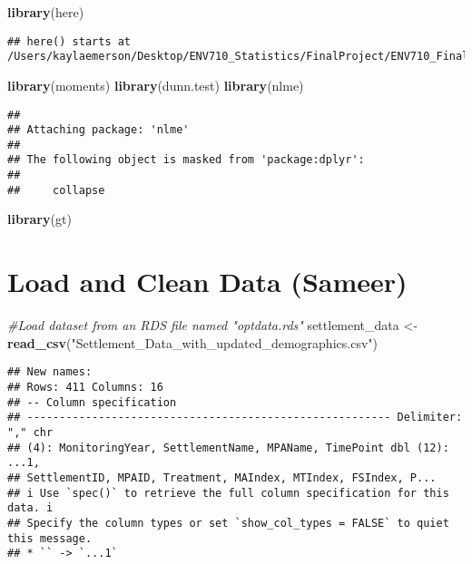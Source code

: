 \documentclass[
]{article}
\newenvironment{Shaded}{\begin{snugshade}}{\end{snugshade}}
\newcommand{\CommentTok}[1]{\textcolor[rgb]{0.56,0.35,0.01}{\textit{#1}}}
\newcommand{\FunctionTok}[1]{\textcolor[rgb]{0.13,0.29,0.53}{\textbf{#1}}}
\newcommand{\NormalTok}[1]{#1}
\newcommand{\OtherTok}[1]{\textcolor[rgb]{0.56,0.35,0.01}{#1}}
\newcommand{\StringTok}[1]{\textcolor[rgb]{0.31,0.60,0.02}{#1}}
\begin{document}
\begin{Shaded}
\begin{Highlighting}[]
\FunctionTok{library}\NormalTok{(here)}
\end{Highlighting}
\end{Shaded}

\begin{verbatim}
## here() starts at /Users/kaylaemerson/Desktop/ENV710_Statistics/FinalProject/ENV710_FinalProject
\end{verbatim}

\begin{Shaded}
\begin{Highlighting}[]
\FunctionTok{library}\NormalTok{(moments)}
\FunctionTok{library}\NormalTok{(dunn.test)}
\FunctionTok{library}\NormalTok{(nlme)}
\end{Highlighting}
\end{Shaded}

\begin{verbatim}
## 
## Attaching package: 'nlme'
## 
## The following object is masked from 'package:dplyr':
## 
##     collapse
\end{verbatim}

\begin{Shaded}
\begin{Highlighting}[]
\FunctionTok{library}\NormalTok{(gt)}
\end{Highlighting}
\end{Shaded}

\section{Load and Clean Data (Sameer)}\label{load-and-clean-data-sameer}

\begin{Shaded}
\begin{Highlighting}[]
\CommentTok{\#Load dataset from an RDS file named "optdata.rds"}
\NormalTok{settlement\_data }\OtherTok{\textless{}{-}} \FunctionTok{read\_csv}\NormalTok{(}\StringTok{"Settlement\_Data\_with\_updated\_demographics.csv"}\NormalTok{)}
\end{Highlighting}
\end{Shaded}

\begin{verbatim}
## New names:
## Rows: 411 Columns: 16
## -- Column specification
## -------------------------------------------------------- Delimiter: "," chr
## (4): MonitoringYear, SettlementName, MPAName, TimePoint dbl (12): ...1,
## SettlementID, MPAID, Treatment, MAIndex, MTIndex, FSIndex, P...
## i Use `spec()` to retrieve the full column specification for this data. i
## Specify the column types or set `show_col_types = FALSE` to quiet this message.
## * `` -> `...1`
\end{verbatim}
\end{document}
